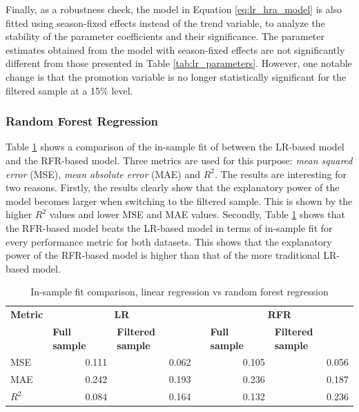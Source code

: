 \noindent
Finally, as a robustness check, the model in Equation \ref{eq:lr_hra_model} is also fitted using season-fixed effects instead of the trend variable, to analyze the stability of the parameter coefficients and their significance. The parameter estimates obtained from the model with season-fixed effects are not significantly different from those presented in Table \ref{tab:lr_parameters}. However, one notable change is that the promotion variable is no longer statistically significant for the filtered sample at a 15\% level.
\newpage

\subsubsection{Random Forest Regression}
Table \ref{tab:forecasting_metrics} shows a comparison of the in-sample fit of between the LR-based model and the RFR-based model. Three metrics are used for this purpose: \textit{mean squared error} (MSE), \textit{mean absolute error} (MAE) and $R^2$. The results are interesting for two reasons. Firstly, the results clearly show that the explanatory power of the model becomes larger when switching to the filtered sample. This is shown by the higher $R^2$ values and lower MSE and MAE values. Secondly, Table \ref{tab:forecasting_metrics} shows that the RFR-based model beats the LR-based model in terms of in-sample fit for every performance metric for both datasets. This shows that the explanatory power of the RFR-based model is higher than that of the more traditional LR-based model.

\begin{table}[htbp]
    \begin{spacing}{1.5}
    \small
    \centering
    \caption{In-sample fit comparison, linear regression vs random forest regression}
    \label{tab:forecasting_metrics}
    \begin{tabular}{p{2cm}rrrrr}
        \toprule
        \toprule
        \textbf{Metric} & \multicolumn{2}{c}{\textbf{LR}} &       & \multicolumn{2}{c}{\textbf{RFR}} \\
        \cmidrule{2-3}\cmidrule{5-6}          & \multicolumn{1}{l}{\textbf{Full sample}} & \multicolumn{1}{l}{\textbf{Filtered sample}} &       & \multicolumn{1}{l}{\textbf{Full sample}} & \multicolumn{1}{l}{\textbf{Filtered sample}} \\
        \midrule
        MSE   & 0.111 & 0.062 &       & 0.105 & 0.056 \\
        MAE   & 0.242 & 0.193 &       & 0.236 & 0.187 \\
        $R^2$    & 0.084 & 0.164 &       & 0.132 & 0.236 \\
        \bottomrule
        \bottomrule
    \end{tabular}
\end{spacing}
\end{table}

